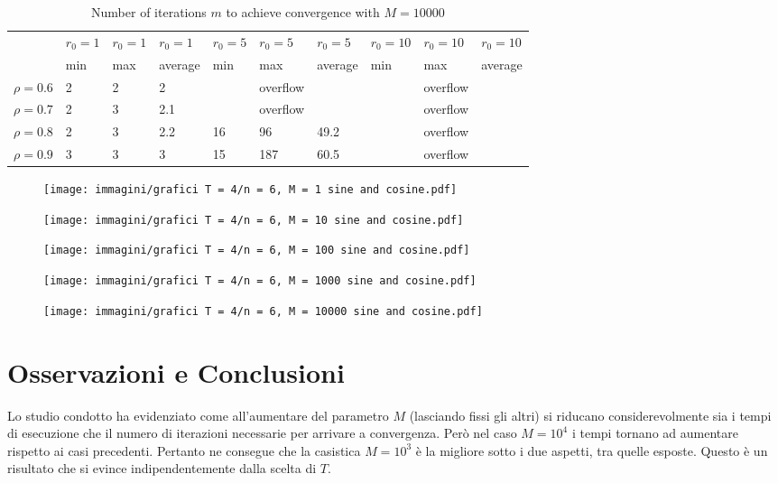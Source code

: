 \documentclass[a4paper,11pt,openright]{report}
\begin{document}
\begin{table}[H]
\centering
\addtolength{\leftskip}{-1.5cm}
\addtolength{\rightskip}{-1.5cm}
\begin{tabular}{|c|lllllllll|}
\hline
$ $ & $r_0 = 1$ & $r_0 = 1$ & $r_0 = 1$ & $r_0 = 5$ & $r_0 = 5$ & $r_0 = 5$ & $r_0 = 10$ & $r_0 = 10$ & $r_0 = 10$  \\
$ $ & min & max & average & min & max & average & min & max & average \\ 
\hline
$\rho = 0.6$ & 2 & 2 & 2 &  & overflow &  &  & overflow &  \\

$\rho = 0.7$ & 2 & 3 & 2.1 &  & overflow &  &  & overflow &  \\

$\rho = 0.8$ & 2 & 3 & 2.2 & 16 & 96 & 49.2 &  & overflow &  \\

$\rho = 0.9$ & 3 & 3 & 3 & 15 & 187 & 60.5 &  & overflow &  \\
\hline
\end{tabular}
\caption{Number of iterations $m$ to achieve convergence with $M = 10000$}
\end{table}
\begin{figure}[H]
\centering
\texttt{[image: immagini/grafici T = 4/n = 6, M = 1 sine and cosine.pdf]}
\end{figure}
\begin{figure}[H]
\centering
\texttt{[image: immagini/grafici T = 4/n = 6, M = 10 sine and cosine.pdf]}
\end{figure}
\begin{figure}[H]
\centering
\texttt{[image: immagini/grafici T = 4/n = 6, M = 100 sine and cosine.pdf]}
\end{figure}
\begin{figure}[H]
\centering
\texttt{[image: immagini/grafici T = 4/n = 6, M = 1000 sine and cosine.pdf]}
\end{figure}
\begin{figure}[H]
\centering
\texttt{[image: immagini/grafici T = 4/n = 6, M = 10000 sine and cosine.pdf]}
\end{figure}
\newpage

\section{Osservazioni e Conclusioni}
Lo studio condotto ha evidenziato come all'aumentare del parametro $M$ (lasciando fissi gli altri) si riducano considerevolmente sia i tempi di esecuzione che il numero di iterazioni necessarie per arrivare a convergenza. Però nel caso $M = 10^4$ i tempi tornano ad aumentare rispetto ai casi precedenti. Pertanto ne consegue che la casistica $M=10^3$ è la migliore sotto i due aspetti, tra quelle esposte. Questo è un risultato che si evince indipendentemente dalla scelta di $T$.
\end{document}
